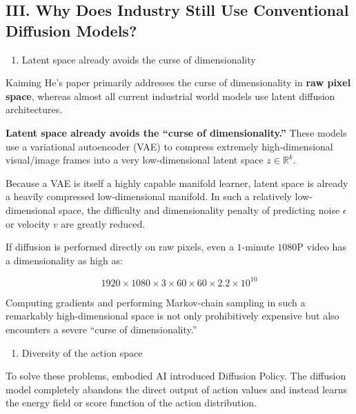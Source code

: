 \hypertarget{iii.-why-does-industry-still-use-conventional-diffusion-models}{%
\subsection{III. Why Does Industry Still Use Conventional Diffusion Models?}\label{iii.-why-does-industry-still-use-conventional-diffusion-models}}

\begin{enumerate}
\def\labelenumi{\arabic{enumi}.}
\tightlist
\item
  Latent space already avoids the curse of dimensionality
\end{enumerate}

Kaiming He's paper primarily addresses the curse of dimensionality in \textbf{raw pixel space}, whereas almost all current industrial world models use latent diffusion architectures.

\textbf{Latent space already avoids the ``curse of dimensionality.''} These models use a variational autoencoder (VAE) to compress extremely high-dimensional visual/image frames into a very low-dimensional latent space \(z\in\mathbb{R}^k\).

Because a VAE is itself a highly capable manifold learner, latent space is already a heavily compressed low-dimensional manifold. In such a relatively low-dimensional space, the difficulty and dimensionality penalty of predicting noise \(\epsilon\) or velocity \(v\) are greatly reduced.

If diffusion is performed directly on raw pixels, even a \(1\)-minute \(1080\)P video has a dimensionality as high as:

\[
1920\times1080\times3\times60\times60\times2.2\times10^{10}
\]

Computing gradients and performing Markov-chain sampling in such a remarkably high-dimensional space is not only prohibitively expensive but also encounters a severe ``curse of dimensionality.''

\begin{enumerate}
\def\labelenumi{\arabic{enumi}.}
\setcounter{enumi}{1}
\tightlist
\item
  Diversity of the action space
\end{enumerate}

To solve these problems, embodied AI introduced Diffusion Policy. The diffusion model completely abandons the direct output of action values and instead learns the energy field or score function of the action distribution.

